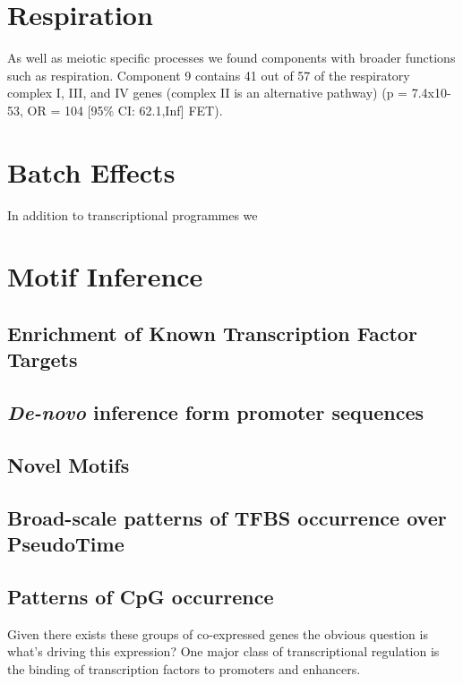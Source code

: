 \section{Respiration}

As well as meiotic specific processes we found components with broader functions such as respiration. Component 9 contains 41 out of 57 of the respiratory complex I, III, and IV genes (complex II is an alternative pathway) (p = 7.4x10-53, OR = 104 [95\% CI: 62.1,Inf] FET).

\section{Batch Effects}

In addition to transcriptional programmes we 

\section{Motif Inference}


\subsection{Enrichment of Known Transcription Factor Targets}

\subsection{\emph{De-novo} inference form promoter sequences}

\subsection{Novel Motifs}

\subsection{Broad-scale patterns of TFBS occurrence over PseudoTime}

\subsection{Patterns of CpG occurrence}

Given there exists these groups of co-expressed genes the obvious question is what's driving this expression? One major class of transcriptional regulation is the binding of transcription factors to promoters and enhancers.


